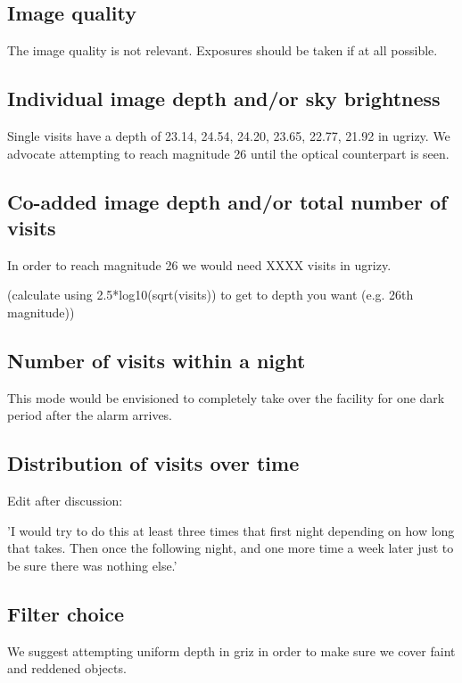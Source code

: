 \documentclass[12pt, letterpaper]{article}
\begin{document}
\subsection{Image quality}

The image quality is not relevant.  Exposures should be taken if at all possible.

\subsection{Individual image depth and/or sky brightness}

Single visits have a depth of 23.14,  24.54, 24.20, 23.65, 22.77,
21.92 in ugrizy.  We advocate attempting to reach magnitude 26 until
the optical counterpart is seen.

\subsection{Co-added image depth and/or total number of visits}

In order to reach magnitude 26 we would need XXXX visits in ugrizy.

(calculate using 2.5*log10(sqrt(visits)) to get to depth you want (e.g. 26th magnitude))

\subsection{Number of visits within a night}

This mode would be envisioned to completely take over the facility for
one dark period after the alarm arrives.

\subsection{Distribution of visits over time}

Edit after discussion:

'I would try to do this at least three times that first night depending
on how long that takes.  Then once the following night, and one more
time a week later just to be sure there was nothing else.' 

\subsection{Filter choice}

We suggest attempting uniform depth in griz in order to make sure we
cover faint and reddened objects.
\end{document}
